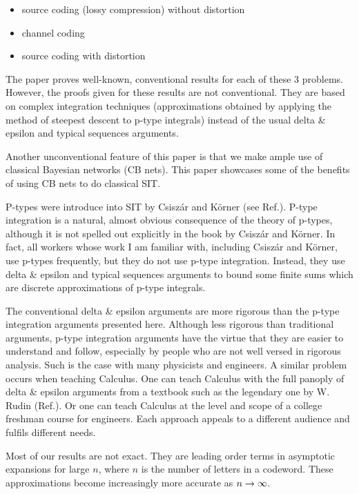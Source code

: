 \documentclass[12pt]{article}
\begin{document}
\begin{itemize}
\item source coding (lossy compression)
without distortion
\item channel coding
\item source coding with distortion
\end{itemize}
The paper proves
well-known, conventional results for
each of these 3 problems. However,
the proofs given for these results
are not conventional. They
are based on complex integration techniques
(approximations obtained by applying
the method of steepest descent to
p-type integrals)
instead of the usual delta \& epsilon
and typical sequences
arguments.

Another
unconventional feature
of this paper
is that we make ample
use of classical Bayesian networks (CB nets).
This paper showcases
some of the benefits of using
CB nets to do classical SIT.


P-types were introduce into SIT
by Csisz\'{a}r and K\"{o}rner (see Ref.\cite{CK}).
P-type integration is
a natural, almost obvious
consequence of the theory of
p-types,
although it is not spelled out
explicitly in the book
by Csisz\'{a}r and K\"{o}rner.
In fact, all workers
whose work I am familiar
with, including Csisz\'{a}r and K\"{o}rner,
use p-types frequently, but
they do not use p-type integration.
Instead, they use delta \& epsilon
and typical sequences
arguments to bound some finite sums
which are discrete approximations
of p-type integrals.

The conventional delta \& epsilon arguments
are more rigorous than
the p-type integration arguments
presented here.
Although less rigorous
than traditional arguments,
p-type integration arguments
have the virtue that they are
easier to understand and follow,
especially
by people who are not well versed
in rigorous analysis.
Such is the case with many
physicists and engineers.
A similar problem occurs
when teaching Calculus.
One can teach
Calculus with the full panoply of
delta \& epsilon arguments
from a textbook such as the
legendary one by W. Rudin (Ref.\cite{Rudin}).
Or one can teach Calculus
at the level and scope of
 a college freshman  course
for engineers.
Each approach appeals to
a different audience and fulfils different
needs.

Most of our results are not
exact. They are
leading order terms
in asymptotic expansions
for large $n$,
where $n$ is the number of letters
in a codeword. These
approximations become increasingly
more accurate as $n\rightarrow \infty$.
\end{document}
